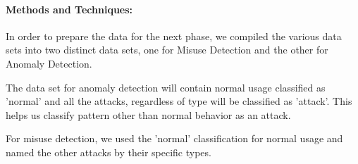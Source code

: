 \documentclass{report}
\begin{document}
  
\paragraph{Methods and Techniques:\\}

In order to prepare the data for the next phase, we compiled the various data sets into two distinct data sets, one for Misuse Detection and the other for Anomaly Detection.

The data set for anomaly detection will contain normal usage classified as 'normal' and all the attacks, regardless of type will be classified as 'attack'. This helps us classify pattern other than normal behavior as an attack. 

For misuse detection, we used the 'normal' classification for normal usage and named the other attacks by their specific types.

  


\end{document}
